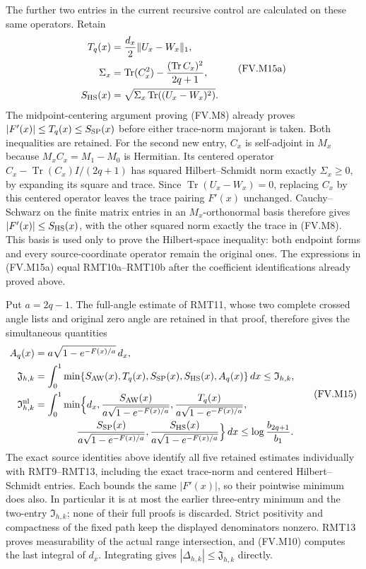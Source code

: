 The further two entries in the current recursive control are calculated
on these same operators. Retain
\[
 \begin{aligned}
 T_q(x)&=\frac{d_x}{2}\|U_x-W_x\|_1,\\
 \Sigma_x&=\operatorname{Tr}(C_x^2)
                -\frac{(\operatorname{Tr}C_x)^2}{2q+1},\\
 S_{\rm HS}(x)&=\sqrt{\Sigma_x
                         \operatorname{Tr}((U_x-W_x)^2)}.
 \end{aligned}\tag{FV.M15a}\label{fvmetric:trace-hs}
\]
The midpoint-centering argument proving (FV.M8) already proves
$|F'(x)|\le T_q(x)\le S_{\rm SP}(x)$ before either trace-norm
majorant is taken. Both inequalities are retained. For the second new
entry, $C_x$ is self-adjoint in $M_x$ because $M_xC_x=M_1-M_0$ is
Hermitian. Its centered operator
$C_x-\operatorname{Tr}(C_x)I/(2q+1)$ has squared Hilbert--Schmidt
norm exactly $\Sigma_x\ge0$, by expanding its square and trace.
Since $\operatorname{Tr}(U_x-W_x)=0$, replacing $C_x$ by this
centered operator leaves the trace pairing $F'(x)$ unchanged.
Cauchy--Schwarz on the finite matrix entries in an $M_x$-orthonormal
basis therefore gives $|F'(x)|\le S_{\rm HS}(x)$, with the other
squared norm exactly the trace in (FV.M8). This basis is used only
to prove the Hilbert-space inequality: both endpoint forms and every
source-coordinate operator remain the original ones. The expressions
in (FV.M15a) equal RMT10a--RMT10b after the coefficient identifications
already proved above.

Put $a=2q-1$. The full-angle estimate of RMT11, whose two complete
crossed angle lists and original zero angle are retained in that proof,
therefore gives the simultaneous quantities
\[
 \begin{aligned}
 A_q(x)&=a\sqrt{1-e^{-F(x)/a}}\,d_x,\\
 \mathfrak J_{h,k}&=\int_0^1
       \min\{S_{\rm AW}(x),T_q(x),S_{\rm SP}(x),S_{\rm HS}(x),A_q(x)\}\,dx
                    \le\mathfrak I_{h,k},\\
 \mathfrak I_{h,k}^{\rm nl}&=\int_0^1\min\Bigl\{d_x,
 \frac{S_{\rm AW}(x)}{a\sqrt{1-e^{-F(x)/a}}},
 \frac{T_q(x)}{a\sqrt{1-e^{-F(x)/a}}},\\
 &\hspace{15mm}
 \frac{S_{\rm SP}(x)}{a\sqrt{1-e^{-F(x)/a}}},
 \frac{S_{\rm HS}(x)}{a\sqrt{1-e^{-F(x)/a}}}\Bigr\}\,dx
                    \le\log\frac{b_{2q+1}}{b_1}.
 \end{aligned}\tag{FV.M15}\label{fvmetric:recursive-integrals}
\]
The exact source identities above identify all five retained estimates
individually with RMT9--RMT13, including the exact trace-norm and
centered Hilbert--Schmidt entries. Each bounds the same $|F'(x)|$, so
their pointwise minimum does also. In particular it is at most the
earlier three-entry minimum and the two-entry $\mathfrak I_{h,k}$;
none of their full proofs is discarded. Strict positivity and compactness
of the fixed path keep the displayed denominators nonzero. RMT13 proves
measurability of the actual range intersection, and (FV.M10) computes
the last integral of $d_x$. Integrating gives
$|\Delta_{h,k}|\le\mathfrak J_{h,k}$ directly.

